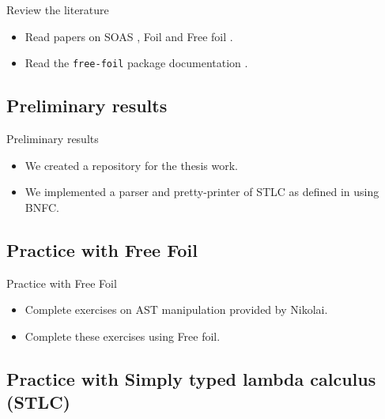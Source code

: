 \documentclass[serif, aspectratio=169]{beamer}
\begin{document}
\begin{frame}{Review the literature}
    \begin{itemize}
        \item Read papers on SOAS \cite{fiore_formal_2022}, Foil \cite{maclaurin_foil_2022} and Free foil \cite{kudasov_free_2024}.
        \item Read the \texttt{free-foil} package documentation \cite{hackage_free_foil}.
    \end{itemize}
\end{frame}

\subsection{Preliminary results}

\begin{frame}{Preliminary results}
    \begin{itemize}
        \item We created a repository \cite{github_query_driven_free_foil} for the thesis work.
        \item We implemented a parser and pretty-printer of STLC as defined in \cite{dunfield_bidirectional_2020} using BNFC.
    \end{itemize}
\end{frame}

\subsection{Practice with Free Foil}

\begin{frame}{Practice with Free Foil}
    \begin{itemize}
        \item Complete exercises on AST manipulation provided by Nikolai.
        \item Complete these exercises using Free foil.
    \end{itemize}
\end{frame}

\subsection{Practice with Simply typed lambda calculus (STLC)}
\end{document}

